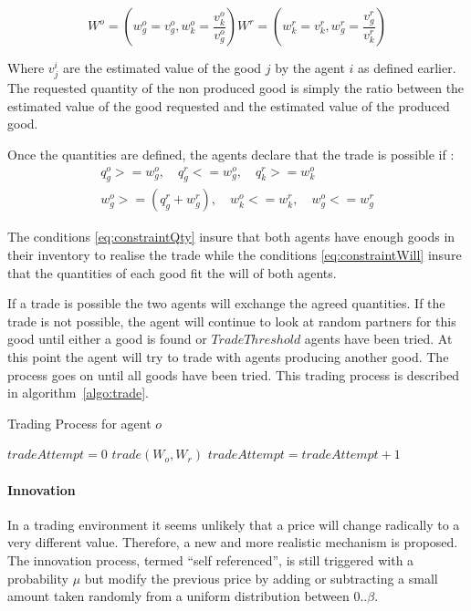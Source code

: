 \documentclass{wscpaperproc}
\begin{document}
\begin{equation}
	 W^o=(w_g^o = v_g^o,w_k^o= \frac{v_k^o}{v_g^o}) 
	 W^r=(w_k^r = v_k^r,w_g^r= \frac{v_g^r}{v_k^r}) 
	 \label{eq:trade}
\end{equation}

 Where $v_j^i$ are the estimated value of the good $j$ by the agent $i$ as defined earlier. 
The requested quantity of the non produced good is simply the ratio between the estimated value of the good requested and the estimated value of the produced good.


Once the quantities are defined, the agents declare that the trade is possible if :
\begin{align}
q_g^o >= w_g^o,\quad q_g^r <= w_g^o,\quad q_k^r >= w_k^o \label{eq:constraintQty}\\
w_g^o>=(q_g^r+w_g^r),\quad w_k^o<=w_k^r,\quad w_g^o<=w_g^r \label{eq:constraintWill}
\end{align}


The conditions \ref{eq:constraintQty} insure that both agents have enough goods in their inventory to realise the trade while the conditions \ref{eq:constraintWill} insure that the quantities of each good fit the will of both agents.



If a trade is possible the two agents will exchange the agreed quantities. If the trade is not possible, the agent will continue to look at random partners for this good until either a good is found or $TradeThreshold$ agents have been tried. At this point the agent will try to trade with agents producing another good. The process goes on until all goods have been tried. This trading process is described in algorithm~\ref{algo:trade}.

\begin{algorithm}
\caption{Trading Process for agent $o$}
\label{algo:trade}
	\begin{algorithmic}[1]
	\scriptsize
			\State $tradeAttempt = 0$
					\State $trade(W_o,W_r)$
				\Else
					\State $tradeAttempt = tradeAttempt + 1$					
				\EndIf
			\EndFor
		\EndFor
\end{algorithmic}
\end{algorithm}


\paragraph{Innovation} In a trading environment it seems unlikely that a price will change radically to a very different value. Therefore, a new and more realistic mechanism is proposed. The innovation process, termed ``self referenced'', is still triggered with a probability $\mu$ 
but modify the previous price by adding or subtracting a small amount taken randomly from a uniform  distribution between $0 .. \beta$.
\end{document}
